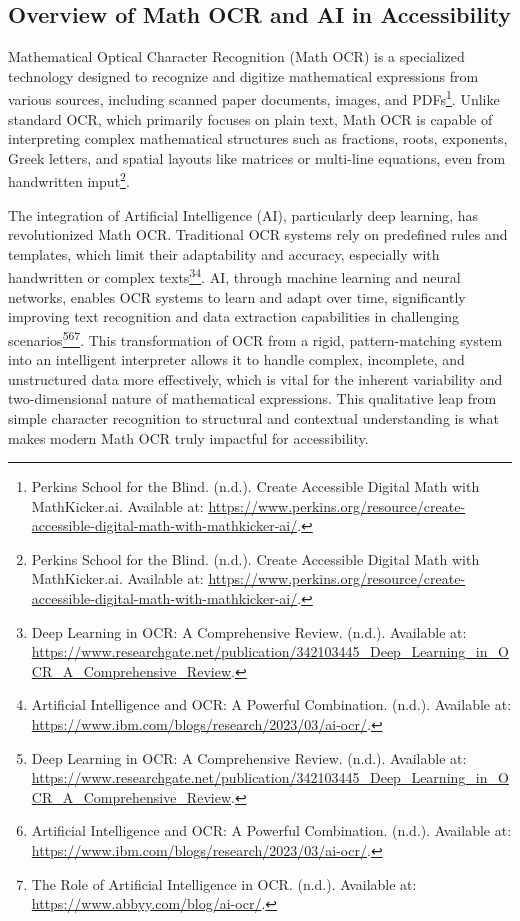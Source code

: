 \subsection{Overview of Math OCR and AI in Accessibility}
Mathematical Optical Character Recognition (Math OCR) is a specialized technology designed to recognize and digitize mathematical expressions from various sources, including scanned paper documents, images, and PDFs\footnote{Perkins School for the Blind. (n.d.). Create Accessible Digital Math with MathKicker.ai. Available at: \url{https://www.perkins.org/resource/create-accessible-digital-math-with-mathkicker-ai/}.}. Unlike standard OCR, which primarily focuses on plain text, Math OCR is capable of interpreting complex mathematical structures such as fractions, roots, exponents, Greek letters, and spatial layouts like matrices or multi-line equations, even from handwritten input\footnote{Perkins School for the Blind. (n.d.). Create Accessible Digital Math with MathKicker.ai. Available at: \url{https://www.perkins.org/resource/create-accessible-digital-math-with-mathkicker-ai/}.}.

The integration of Artificial Intelligence (AI), particularly deep learning, has revolutionized Math OCR. Traditional OCR systems rely on predefined rules and templates, which limit their adaptability and accuracy, especially with handwritten or complex texts\footnote{Deep Learning in OCR: A Comprehensive Review. (n.d.). Available at: \url{https://www.researchgate.net/publication/342103445_Deep_Learning_in_OCR_A_Comprehensive_Review}.}\footnote{Artificial Intelligence and OCR: A Powerful Combination. (n.d.). Available at: \url{https://www.ibm.com/blogs/research/2023/03/ai-ocr/}.}. AI, through machine learning and neural networks, enables OCR systems to learn and adapt over time, significantly improving text recognition and data extraction capabilities in challenging scenarios\footnote{Deep Learning in OCR: A Comprehensive Review. (n.d.). Available at: \url{https://www.researchgate.net/publication/342103445_Deep_Learning_in_OCR_A_Comprehensive_Review}.}\footnote{Artificial Intelligence and OCR: A Powerful Combination. (n.d.). Available at: \url{https://www.ibm.com/blogs/research/2023/03/ai-ocr/}.}\footnote{The Role of Artificial Intelligence in OCR. (n.d.). Available at: \url{https://www.abbyy.com/blog/ai-ocr/}.}. This transformation of OCR from a rigid, pattern-matching system into an intelligent interpreter allows it to handle complex, incomplete, and unstructured data more effectively, which is vital for the inherent variability and two-dimensional nature of mathematical expressions. This qualitative leap from simple character recognition to structural and contextual understanding is what makes modern Math OCR truly impactful for accessibility.


